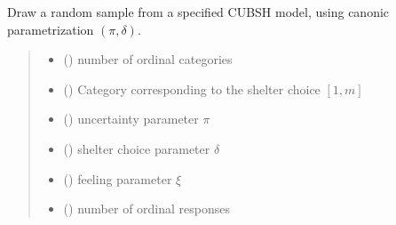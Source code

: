 \documentclass[letterpaper,10pt,english]{sphinxmanual}
\begin{document}

\begin{fulllineitems}
\label{\detokenize{cubmods:cubmods.cubsh.draw}}
\pysigstartsignatures
{}
\pysigstopsignatures
\sphinxAtStartPar
Draw a random sample from a specified CUBSH model,
using canonic parametrization \((\pi, \delta)\).
\begin{quote}\begin{description}
\begin{itemize}
\item {} 
\sphinxAtStartPar
{} () \textendash{} number of ordinal categories

\item {} 
\sphinxAtStartPar
{} () \textendash{} Category corresponding to the shelter choice \([1,m]\)

\item {} 
\sphinxAtStartPar
{} () \textendash{} uncertainty parameter \(\pi\)

\item {} 
\sphinxAtStartPar
{} () \textendash{} shelter choice parameter \(\delta\)

\item {} 
\sphinxAtStartPar
{} () \textendash{} feeling parameter \(\xi\)

\item {} 
\sphinxAtStartPar
{} () \textendash{} number of ordinal responses


\end{itemize}
\end{description}
\end{quote}
\end{fulllineitems}
\end{document}
